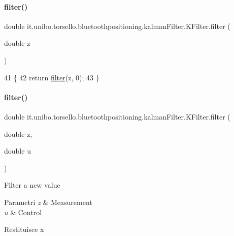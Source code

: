 \paragraph{\texorpdfstring{filter()}{filter()}\hspace{0.1cm}{\footnotesize\ttfamily [1/2]}}
{\footnotesize\ttfamily double it.\+unibo.\+torsello.\+bluetoothpositioning.\+kalman\+Filter.\+K\+Filter.\+filter (\begin{DoxyParamCaption}\item[{double}]{z }\end{DoxyParamCaption})}


\begin{DoxyCode}
41                                    \{
42         \textcolor{keywordflow}{return} \hyperlink{classit_1_1unibo_1_1torsello_1_1bluetoothpositioning_1_1kalmanFilter_1_1KFilter_a6904818e94d959f8e25a8699d6885c21_a6904818e94d959f8e25a8699d6885c21}{filter}(z, 0);
43     \}
\end{DoxyCode}
\hypertarget{classit_1_1unibo_1_1torsello_1_1bluetoothpositioning_1_1kalmanFilter_1_1KFilter_a376767db8e40babdacbbc9165a50a1a2_a376767db8e40babdacbbc9165a50a1a2}{}\label{classit_1_1unibo_1_1torsello_1_1bluetoothpositioning_1_1kalmanFilter_1_1KFilter_a376767db8e40babdacbbc9165a50a1a2_a376767db8e40babdacbbc9165a50a1a2} 
\paragraph{\texorpdfstring{filter()}{filter()}\hspace{0.1cm}{\footnotesize\ttfamily [2/2]}}
{\footnotesize\ttfamily double it.\+unibo.\+torsello.\+bluetoothpositioning.\+kalman\+Filter.\+K\+Filter.\+filter (\begin{DoxyParamCaption}\item[{double}]{z,  }\item[{double}]{u }\end{DoxyParamCaption})\hspace{0.3cm}{\ttfamily [private]}}

Filter a new value


\begin{DoxyParams}{Parametri}
{\em z} & Measurement \\
\hline
{\em u} & Control \\
\hline
\end{DoxyParams}
\begin{DoxyReturn}{Restituisce}
x 
\end{DoxyReturn}

